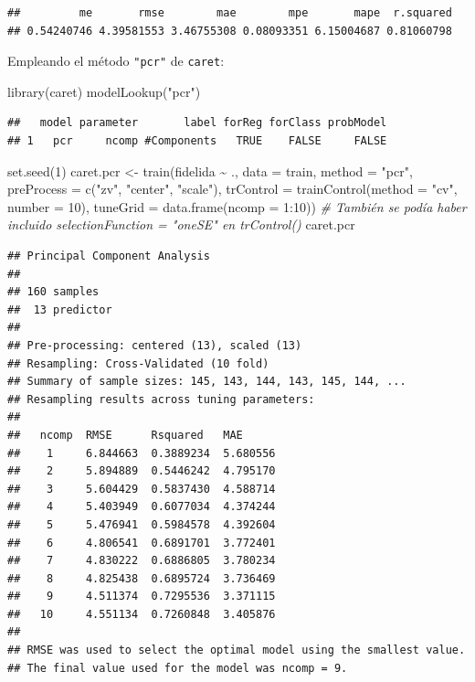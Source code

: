 \documentclass[
]{book}
\newenvironment{Shaded}{\begin{snugshade}}{\end{snugshade}}
\newcommand{\AttributeTok}[1]{\textcolor[rgb]{0.77,0.63,0.00}{#1}}
\newcommand{\CommentTok}[1]{\textcolor[rgb]{0.56,0.35,0.01}{\textit{#1}}}
\newcommand{\DecValTok}[1]{\textcolor[rgb]{0.00,0.00,0.81}{#1}}
\newcommand{\FunctionTok}[1]{\textcolor[rgb]{0.00,0.00,0.00}{#1}}
\newcommand{\NormalTok}[1]{#1}
\newcommand{\OtherTok}[1]{\textcolor[rgb]{0.56,0.35,0.01}{#1}}
\newcommand{\SpecialCharTok}[1]{\textcolor[rgb]{0.00,0.00,0.00}{#1}}
\newcommand{\StringTok}[1]{\textcolor[rgb]{0.31,0.60,0.02}{#1}}
\theoremstyle{break}
\theoremstyle{definition}
\theoremstyle{definition}
\theoremstyle{definition}
\theoremstyle{definition}
\theoremstyle{remark}
\begin{document}
\begin{verbatim}
##         me       rmse        mae        mpe       mape  r.squared 
## 0.54240746 4.39581553 3.46755308 0.08093351 6.15004687 0.81060798
\end{verbatim}

Empleando el método \texttt{"pcr"} de \texttt{caret}:

\begin{Shaded}
\begin{Highlighting}[]
\FunctionTok{library}\NormalTok{(caret)}
\FunctionTok{modelLookup}\NormalTok{(}\StringTok{"pcr"}\NormalTok{)}
\end{Highlighting}
\end{Shaded}

\begin{verbatim}
##   model parameter       label forReg forClass probModel
## 1   pcr     ncomp #Components   TRUE    FALSE     FALSE
\end{verbatim}

\begin{Shaded}
\begin{Highlighting}[]
\FunctionTok{set.seed}\NormalTok{(}\DecValTok{1}\NormalTok{)}
\NormalTok{caret.pcr }\OtherTok{\textless{}{-}} \FunctionTok{train}\NormalTok{(fidelida }\SpecialCharTok{\textasciitilde{}}\NormalTok{ ., }\AttributeTok{data =}\NormalTok{ train, }\AttributeTok{method =} \StringTok{"pcr"}\NormalTok{,}
                   \AttributeTok{preProcess =} \FunctionTok{c}\NormalTok{(}\StringTok{"zv"}\NormalTok{, }\StringTok{"center"}\NormalTok{, }\StringTok{"scale"}\NormalTok{),}
                   \AttributeTok{trControl =} \FunctionTok{trainControl}\NormalTok{(}\AttributeTok{method =} \StringTok{"cv"}\NormalTok{, }\AttributeTok{number =} \DecValTok{10}\NormalTok{),}
                   \AttributeTok{tuneGrid =} \FunctionTok{data.frame}\NormalTok{(}\AttributeTok{ncomp =} \DecValTok{1}\SpecialCharTok{:}\DecValTok{10}\NormalTok{))}
\CommentTok{\# También se podía haber incluido \textasciigrave{}selectionFunction = "oneSE"\textasciigrave{} en \textasciigrave{}trControl()\textasciigrave{}}
\NormalTok{caret.pcr}
\end{Highlighting}
\end{Shaded}

\begin{verbatim}
## Principal Component Analysis 
## 
## 160 samples
##  13 predictor
## 
## Pre-processing: centered (13), scaled (13) 
## Resampling: Cross-Validated (10 fold) 
## Summary of sample sizes: 145, 143, 144, 143, 145, 144, ... 
## Resampling results across tuning parameters:
## 
##   ncomp  RMSE      Rsquared   MAE     
##    1     6.844663  0.3889234  5.680556
##    2     5.894889  0.5446242  4.795170
##    3     5.604429  0.5837430  4.588714
##    4     5.403949  0.6077034  4.374244
##    5     5.476941  0.5984578  4.392604
##    6     4.806541  0.6891701  3.772401
##    7     4.830222  0.6886805  3.780234
##    8     4.825438  0.6895724  3.736469
##    9     4.511374  0.7295536  3.371115
##   10     4.551134  0.7260848  3.405876
## 
## RMSE was used to select the optimal model using the smallest value.
## The final value used for the model was ncomp = 9.
\end{verbatim}
\end{document}
